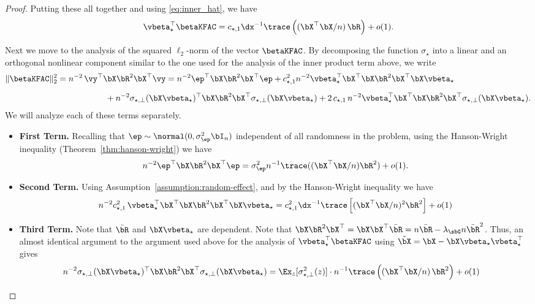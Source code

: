 \begin{proof}
    Putting these all together and using \eqref{eq:inner_hat}, we have
    \begin{align}
        \label{eq:inner_hat_final}
        \vbeta_\star^\top \betaKFAC = c_{\star,1} \dx^{-1} \trace\left((\bX^\top\bX/n)\,\bR\right) + o(1).
    \end{align}
    
    Next we move to the analysis of the squared $\ell_2$-norm of the vector $\betaKFAC$. By decomposing the function $\sigma_\star$ into a linear and an orthogonal nonlinear component similar to the one used for the analysis of the inner product term above, we write
    \begin{align*}
        \|\betaKFAC\|_2^2 &= n^{-2}\, \vy^\top \bX \bR^2 \bX^\top \vy
           = n^{-2}\boldsymbol{\ep}^\top \bX \bR^2 \bX^\top\boldsymbol{\ep}+ c_{\star,1}^2 n^{-2} \vbeta_\star^\top \bX^\top  \bX \bR^2 \bX^\top\bX\vbeta_\star\\[0.2cm] &\hspace{2cm} +n^{-2} \sigma_{\star, \perp}(\bX\vbeta_\star)^\top \bX \bR^2 \bX^\top\sigma_{\star, \perp}(\bX\vbeta_\star) + 2\, c_{\star, 1} \, n^{-2} \vbeta_\star^\top \bX^\top  \bX \bR^2 \bX^\top\sigma_{\star,\perp}(\bX\vbeta_\star).
    \end{align*}
    We will analyze each of these terms separately.
    \begin{itemize}
        \item \textbf{First Term.} Recalling that $\boldsymbol{\ep} \sim \normal(0, \sigma_\ep^2 \bI_n)$ independent of all randomness in the problem, using the Hanson-Wright inequality (Theorem~\ref{thm:hanson-wright}) we have
        \begin{align*}
            n^{-2}\boldsymbol{\ep}^\top \bX \bR^2 \bX^\top\boldsymbol{\ep} = \sigma_\ep^2 n^{-1} \trace( (\bX^\top\bX/n) \bR^2 ) + o(1).
        \end{align*}
    
        \item \textbf{Second Term.} Using Assumption~\ref{assumption:random-effect}, and by the Hanson-Wright inequality we have
        \begin{align*}
             n^{-2}c_{\star,1}^2\, \vbeta_\star^\top \bX^\top \bX\bR^2\bX^\top\bX\vbeta_\star =  c_{\star, 1}^2  \dx^{-1}   \trace \left[(\bX^\top\bX/n)^2\bR^2\right] + o(1)
        \end{align*}
        
        \item \textbf{Third Term.} Note that $\bar\bR$ and $ \bX\vbeta_\star$ are dependent. Note that $\bX\bR^2\bX^\top = \bX\bX^\top \bar\bR = n\bar\bR - \lambda_\sbG n \bar\bR^2$. Thus, an almost identical argument to the argument used above for the analysis of $\vbeta_\star^\top \betaKFAC$ using $\tilde\bX = \bX - \bX\vbeta_\star\vbeta_\star^\top$ gives
        \begin{align*}
        n^{-2} \sigma_{\star, \perp}(\bX\vbeta_\star)^\top \bX \bR^2 \bX^\top\sigma_{\star, \perp}(\bX\vbeta_\star)  
        &= \Ex_z[\sigma^2_{\star,\perp}(z)] \cdot n^{-1} \trace\left((\bX^\top\bX/n)\,\bR^2\right) + o(1)
        \end{align*}
        

\end{itemize}
\end{proof}

